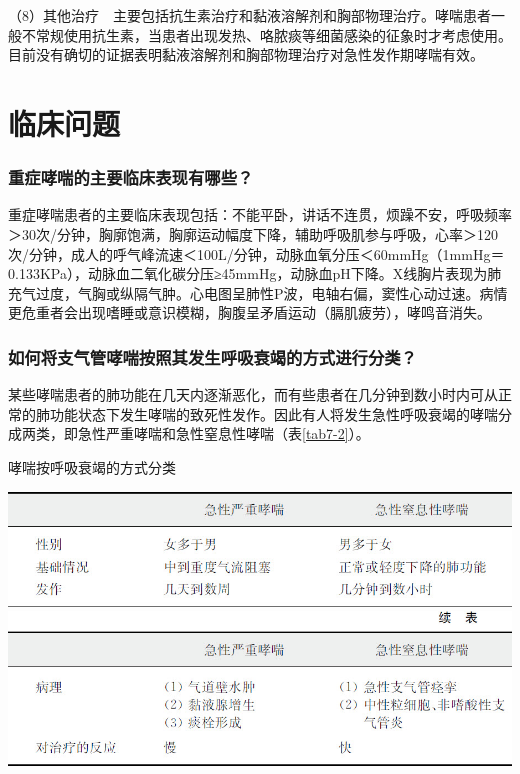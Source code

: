 （8）其他治疗　主要包括抗生素治疗和黏液溶解剂和胸部物理治疗。哮喘患者一般不常规使用抗生素，当患者出现发热、咯脓痰等细菌感染的征象时才考虑使用。目前没有确切的证据表明黏液溶解剂和胸部物理治疗对急性发作期哮喘有效。

\section{临床问题}

\subsubsection{重症哮喘的主要临床表现有哪些？}

重症哮喘患者的主要临床表现包括：不能平卧，讲话不连贯，烦躁不安，呼吸频率＞30次/分钟，胸廓饱满，胸廓运动幅度下降，辅助呼吸肌参与呼吸，心率＞120次/分钟，成人的呼气峰流速＜100L/分钟，动脉血氧分压＜60mmHg（1mmHg＝0.133KPa），动脉血二氧化碳分压≥45mmHg，动脉血pH下降。X线胸片表现为肺充气过度，气胸或纵隔气肿。心电图呈肺性P波，电轴右偏，窦性心动过速。病情更危重者会出现嗜睡或意识模糊，胸腹呈矛盾运动（膈肌疲劳），哮鸣音消失。

\subsubsection{如何将支气管哮喘按照其发生呼吸衰竭的方式进行分类？}

某些哮喘患者的肺功能在几天内逐渐恶化，而有些患者在几分钟到数小时内可从正常的肺功能状态下发生哮喘的致死性发作。因此有人将发生急性呼吸衰竭的哮喘分成两类，即急性严重哮喘和急性窒息性哮喘（表\ref{tab7-2}）。

\begin{table}[htbp]
\centering
\caption{哮喘按呼吸衰竭的方式分类}
\label{tab7-2}
\includegraphics{./images/Image00055.jpg}
\includegraphics{./images/Image00056.jpg}
\end{table}



